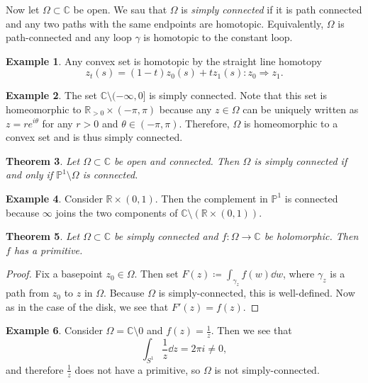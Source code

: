 \documentclass[leqno, openany]{memoir}
\newtheorem{thm}{Theorem}[section]
\theoremstyle{definition}
\newtheorem{exm}[thm]{Example}
\theoremstyle{remark}
\theoremstyle{plain}
\theoremstyle{definition}
\theoremstyle{remark}
\newcommand{\R}{\mathbb{R}}
\newcommand{\C}{\mathbb{C}}
\renewcommand{\P}{\mathbb{P}}
\begin{document}
Now let $\Omega \subset \C$ be open. We sau that $\Omega$ is \textit{simply connected} if it is path connected and any two paths with the same endpoints are homotopic. Equivalently, $\Omega$ is path-connected and any loop $\gamma$ is homotopic to the constant loop.

\begin{exm}
    Any convex set is homotopic by the straight line homotopy
    \[ z_t(s) = (1-t) z_0(s) + t z_1(s) \colon z_0 \Rightarrow z_1. \]
\end{exm}

\begin{exm}
    The set $\C \setminus (-\infty, 0]$ is simply connected. Note that this set is homeomorphic to $\R_{> 0} \times (-\pi, \pi)$ because any $z \in \Omega$ can be uniquely written as $z = re^{i\theta}$ for any $r > 0$ and $\theta \in (-\pi, \pi)$. Therefore, $\Omega$ is homeomorphic to a convex set and is thus simply connected.
\end{exm}

\begin{thm}
    Let $\Omega \subset \C$ be open and connected. Then $\Omega$ is simply connected if and only if $\P^1 \setminus \Omega$ is connected.
\end{thm}

\begin{exm}
    Consider $\R \times (0,1)$. Then the complement in $\P^1$ is connected because $\infty$ joins the two components of $\C \setminus (\R \times (0,1))$.
\end{exm}

\begin{thm}
    Let $\Omega \subset \C$ be simply connected and $f \colon \Omega \to \C$ be holomorphic. Then $f$ has a primitive.
\end{thm}

\begin{proof}
    Fix a basepoint $z_0 \in \Omega$. Then set $F(z) \coloneqq \int_{\gamma_z} f(w) \dd{w}$, where $\gamma_z$ is a path from $z_0$ to $z$ in $\Omega$. Because $\Omega$ is simply-connected, this is well-defined. Now as in the case of the disk, we see that $F'(z) = f(z)$.
\end{proof}

\begin{exm}
    Consider $\Omega = \C \setminus \qty{0}$ and $f(z) = \frac{1}{z}$. Then we see that 
    \[ \int_{S^1} \frac{1}{z} \dd{z} = 2 \pi i \neq 0, \]
    and therefore $\frac{1}{z}$ does not have a primitive, so $\Omega$ is not simply-connected.
\end{exm}
\end{document}
